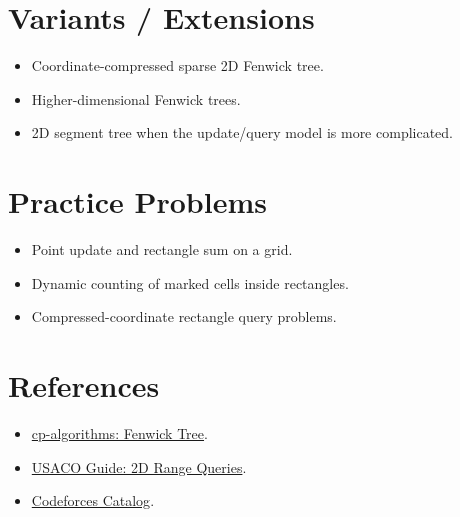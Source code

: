 \section*{Variants / Extensions}

\begin{itemize}
  \item Coordinate-compressed sparse 2D Fenwick tree.
  \item Higher-dimensional Fenwick trees.
  \item 2D segment tree when the update/query model is more complicated.
\end{itemize}

\section*{Practice Problems}

\begin{itemize}
  \item Point update and rectangle sum on a grid.
  \item Dynamic counting of marked cells inside rectangles.
  \item Compressed-coordinate rectangle query problems.
\end{itemize}

\section*{References}

\begin{itemize}
  \item \href{https://cp-algorithms.com/data_structures/fenwick.html}{cp-algorithms: Fenwick Tree}.
  \item \href{https://usaco.guide/plat/2DRQ}{USACO Guide: 2D Range Queries}.
  \item \href{https://codeforces.com/catalog}{Codeforces Catalog}.
\end{itemize}
